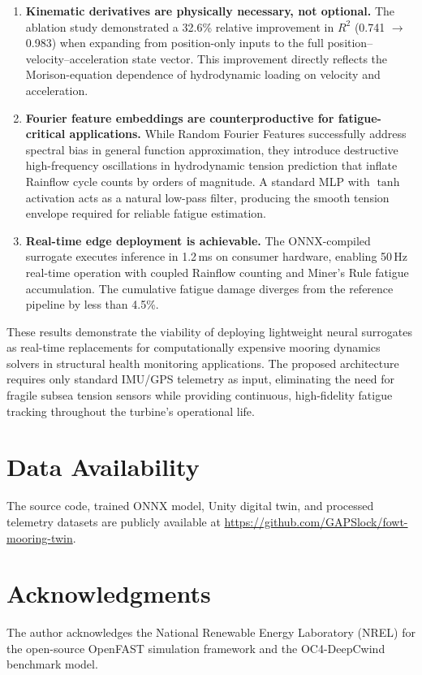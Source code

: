 \documentclass[preprint,12pt]{elsarticle}
\begin{document}
\begin{enumerate}
    \item \textbf{Kinematic derivatives are physically necessary, not optional.} The ablation study demonstrated a 32.6\% relative improvement in $R^2$ (0.741 $\to$ 0.983) when expanding from position-only inputs to the full position--velocity--acceleration state vector. This improvement directly reflects the Morison-equation dependence of hydrodynamic loading on velocity and acceleration.

    \item \textbf{Fourier feature embeddings are counterproductive for fatigue-critical applications.} While Random Fourier Features successfully address spectral bias in general function approximation, they introduce destructive high-frequency oscillations in hydrodynamic tension prediction that inflate Rainflow cycle counts by orders of magnitude. A standard MLP with $\tanh$ activation acts as a natural low-pass filter, producing the smooth tension envelope required for reliable fatigue estimation.

    \item \textbf{Real-time edge deployment is achievable.} The ONNX-compiled surrogate executes inference in 1.2\,ms on consumer hardware, enabling 50\,Hz real-time operation with coupled Rainflow counting and Miner's Rule fatigue accumulation. The cumulative fatigue damage diverges from the reference pipeline by less than 4.5\%.
\end{enumerate}

These results demonstrate the viability of deploying lightweight neural surrogates as real-time replacements for computationally expensive mooring dynamics solvers in structural health monitoring applications. The proposed architecture requires only standard IMU/GPS telemetry as input, eliminating the need for fragile subsea tension sensors while providing continuous, high-fidelity fatigue tracking throughout the turbine's operational life.

\section*{Data Availability}

The source code, trained ONNX model, Unity digital twin, and processed telemetry datasets are publicly available at \url{https://github.com/GAPSlock/fowt-mooring-twin}.

\section*{Acknowledgments}

The author acknowledges the National Renewable Energy Laboratory (NREL) for the open-source OpenFAST simulation framework and the OC4-DeepCwind benchmark model.



\end{document}
